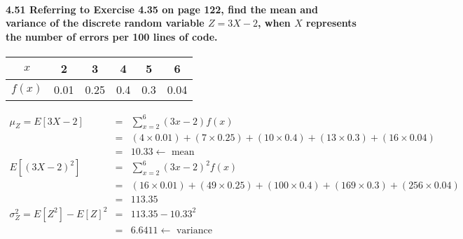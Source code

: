 \documentclass{article}
\begin{document}

\paragraph{4.51 Referring to Exercise 4.35 on page 122, find the mean and 
variance of the discrete random variable $Z=3X-2$, when $X$ represents the 
number of errors per 100 lines of code.}
\begin{center}\begin{tabular}{c|c c c c c}
$x$    & 2    & 3    & 4   & 5   & 6\\
\hline
$f(x)$ & 0.01 & 0.25 & 0.4 & 0.3 & 0.04
\end{tabular}\end{center}
\begin{eqnarray*}
\mu_Z = E[3X-2] & = & \sum_{x=2}^6 (3x-2)f(x)\\
	& = & (4\times0.01) + (7\times0.25) + (10\times0.4) + (13\times0.3) + 
		(16\times0.04)\\
	& = & \boxed{10.33} \leftarrow\mbox{ mean}\\
E[(3X-2)^2] & = & \sum_{x=2}^6 (3x-2)^2f(x)\\
	& = & (16\times0.01) + (49\times0.25) + (100\times0.4) + (169\times0.3) + 
		(256\times0.04)\\
	& = & 113.35\\
\sigma_Z^2 = E[Z^2]-E[Z]^2 & = & 113.35-10.33^2\\
	& = & \boxed{6.6411} \leftarrow\mbox{ variance}
\end{eqnarray*}

\pagebreak
\end{document}
